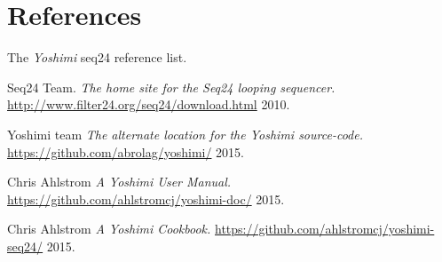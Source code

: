 %
%
%

\section{References}
\label{sec:seq24_references}

   The \textsl{Yoshimi} seq24 reference list.

\begin{thebibliography}{99}

   Seq24 Team.
   \emph{The home site for the Seq24 looping sequencer.}
   \url{http://www.filter24.org/seq24/download.html}
   2010.

   Yoshimi team
   \emph{The alternate location for the Yoshimi source-code.}
   \url{https://github.com/abrolag/yoshimi/}
   2015.

   Chris Ahlstrom
   \emph{A Yoshimi User Manual.}
   \url{https://github.com/ahlstromcj/yoshimi-doc/}
   2015.

   Chris Ahlstrom
   \emph{A Yoshimi Cookbook.}
   \url{https://github.com/ahlstromcj/yoshimi-seq24/}
   2015.

\end{thebibliography}

